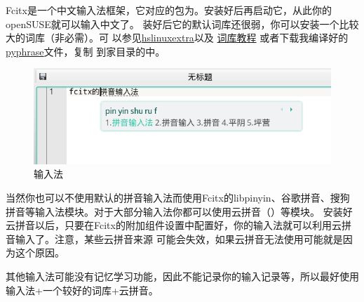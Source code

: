 Fcitx是一个中文输入法框架，它对应的包为。安装好后再启动它，从此你的openSUSE就可以输入中文了。
装好后它的默认词库还很弱，你可以安装一个比较大的词库（非必需）。可%
以参见\href{https://code.google.com/p/hslinuxextra/}{hs\-linux\-extra}以及%
\href{https://www.librehat.com/fcitx-sogou-pinyin-cell-database-convert-import-guide/}{词库教程}%
或者下载我编译好的\href{http://pan.baidu.com/s/1i3HtJ4T}{pyphrase}文件，复制
到家目录的中。
\begin{figure}[htbp!]
\centering
\includegraphics[width=\textwidth]{./pic/fcitx.png} 
\caption{输入法}\label{fcitx}
\end{figure}

当然你也可以不使用默认的拼音输入法而使用Fcitx的lib\-pin\-yin、谷歌拼音、搜狗拼音等输入法模块。对于大部分输入法你都可以使用云拼音（）等模块。
安装好云拼音以后，只要在Fcitx的附加组件设置中配置好，你的输入法就可以利用云拼音输入了。注意，某些云拼音来源
可能会失效，如果云拼音无法使用可能就是因为这个原因。

其他输入法可能没有记忆学习功能，因此不能记录你的输入记录等，所以最好使用输入法+一个较好的词库+云拼音。

